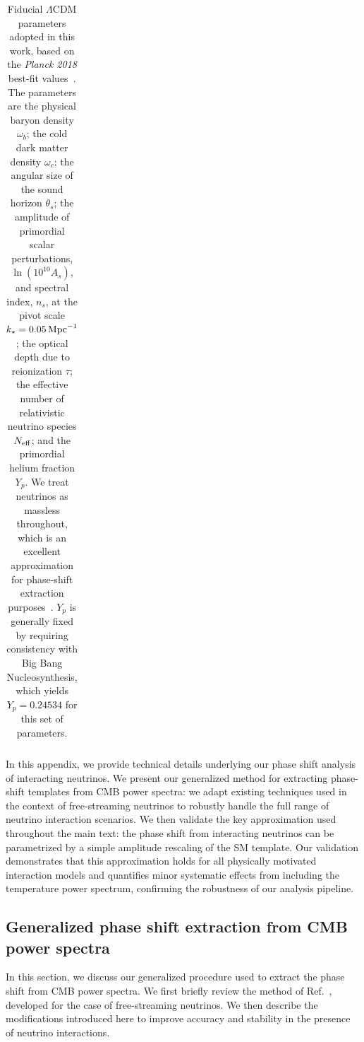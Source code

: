 \begin{subappendices}
\begin{table}
\begin{tabular}{lc}
			\bottomrule
	\end{tabular}
	\caption[Fiducial cosmological parameters for phase-shift extraction]{Fiducial $\Lambda$CDM parameters adopted in this work, based on the {\it Planck 2018} best-fit values~\cite{Planck:2018vyg}. The parameters are the physical baryon density $\omega_b$; the cold dark matter density $\omega_c$; the angular size of the sound horizon $\theta_s$; the amplitude of primordial scalar perturbations, $\ln(10^{10}A_s)$, and spectral index, $n_s$, at the pivot scale $k_\star = 0.05\,{\rm Mpc}^{-1}$; the optical depth due to reionization $\tau$; the effective number of relativistic neutrino species $N_{\rm eff}$; and the primordial helium fraction $Y_p$. We treat neutrinos as massless throughout, which is an excellent approximation for phase-shift extraction purposes~\cite{Montefalcone:2025unv}. $Y_p$ is generally fixed by requiring consistency with Big Bang Nucleosynthesis, which yields $Y_p = 0.24534$ for this set of parameters.}
\label{tab:ch13-parameters}
\end{table}

\noindent In this appendix, we provide technical details underlying our phase shift analysis of interacting neutrinos. We present our generalized method for extracting phase-shift templates from CMB power spectra: we adapt existing  techniques used in the context of free-streaming neutrinos to robustly handle the full range of neutrino interaction scenarios. We then validate the key approximation used throughout the main text: the phase shift from interacting neutrinos can be parametrized by a simple amplitude rescaling of the SM template. Our validation demonstrates that this approximation holds for all physically motivated interaction models and quantifies minor systematic effects from including the temperature power spectrum, confirming the robustness of our analysis pipeline.



\subsection{Generalized phase shift extraction from CMB power spectra}
\noindent In this section, we discuss our generalized procedure used to extract the phase shift from CMB power spectra. We first briefly review the method of Ref.~\cite{Follin:2015hya,Montefalcone:2025unv}, developed for the case of free-streaming neutrinos. We then describe the modifications introduced here to improve accuracy and stability in the presence of neutrino interactions.


\end{subappendices}
